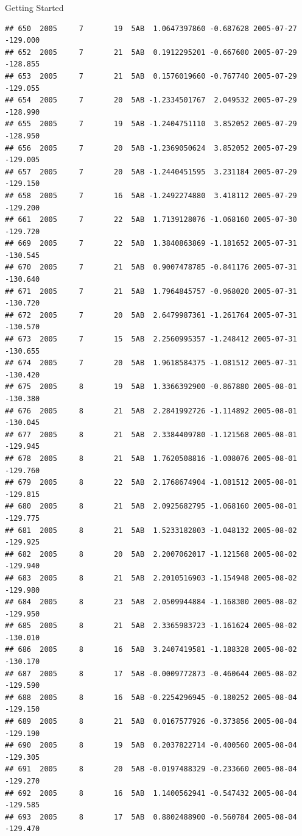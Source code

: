 \documentclass[
  ignorenonframetext,
]{beamer}
\begin{document}
\begin{frame}[fragile]{Getting Started}
\begin{verbatim}
## 650  2005     7       19  5AB  1.0647397860 -0.687628 2005-07-27 -129.000
## 652  2005     7       21  5AB  0.1912295201 -0.667600 2005-07-29 -128.855
## 653  2005     7       21  5AB  0.1576019660 -0.767740 2005-07-29 -129.055
## 654  2005     7       20  5AB -1.2334501767  2.049532 2005-07-29 -128.990
## 655  2005     7       19  5AB -1.2404751110  3.852052 2005-07-29 -128.950
## 656  2005     7       20  5AB -1.2369050624  3.852052 2005-07-29 -129.005
## 657  2005     7       20  5AB -1.2440451595  3.231184 2005-07-29 -129.150
## 658  2005     7       16  5AB -1.2492274880  3.418112 2005-07-29 -129.200
## 661  2005     7       22  5AB  1.7139128076 -1.068160 2005-07-30 -129.720
## 669  2005     7       22  5AB  1.3840863869 -1.181652 2005-07-31 -130.545
## 670  2005     7       21  5AB  0.9007478785 -0.841176 2005-07-31 -130.640
## 671  2005     7       21  5AB  1.7964845757 -0.968020 2005-07-31 -130.720
## 672  2005     7       20  5AB  2.6479987361 -1.261764 2005-07-31 -130.570
## 673  2005     7       15  5AB  2.2560995357 -1.248412 2005-07-31 -130.655
## 674  2005     7       20  5AB  1.9618584375 -1.081512 2005-07-31 -130.420
## 675  2005     8       19  5AB  1.3366392900 -0.867880 2005-08-01 -130.380
## 676  2005     8       21  5AB  2.2841992726 -1.114892 2005-08-01 -130.045
## 677  2005     8       21  5AB  2.3384409780 -1.121568 2005-08-01 -129.945
## 678  2005     8       21  5AB  1.7620508816 -1.008076 2005-08-01 -129.760
## 679  2005     8       22  5AB  2.1768674904 -1.081512 2005-08-01 -129.815
## 680  2005     8       21  5AB  2.0925682795 -1.068160 2005-08-01 -129.775
## 681  2005     8       21  5AB  1.5233182803 -1.048132 2005-08-02 -129.925
## 682  2005     8       20  5AB  2.2007062017 -1.121568 2005-08-02 -129.940
## 683  2005     8       21  5AB  2.2010516903 -1.154948 2005-08-02 -129.980
## 684  2005     8       23  5AB  2.0509944884 -1.168300 2005-08-02 -129.950
## 685  2005     8       21  5AB  2.3365983723 -1.161624 2005-08-02 -130.010
## 686  2005     8       16  5AB  3.2407419581 -1.188328 2005-08-02 -130.170
## 687  2005     8       17  5AB -0.0009772873 -0.460644 2005-08-02 -129.590
## 688  2005     8       16  5AB -0.2254296945 -0.180252 2005-08-04 -129.150
## 689  2005     8       21  5AB  0.0167577926 -0.373856 2005-08-04 -129.190
## 690  2005     8       19  5AB  0.2037822714 -0.400560 2005-08-04 -129.305
## 691  2005     8       20  5AB -0.0197488329 -0.233660 2005-08-04 -129.270
## 692  2005     8       16  5AB  1.1400562941 -0.547432 2005-08-04 -129.585
## 693  2005     8       17  5AB  0.8802488900 -0.560784 2005-08-04 -129.470

\end{verbatim}
\end{frame}
\end{document}
